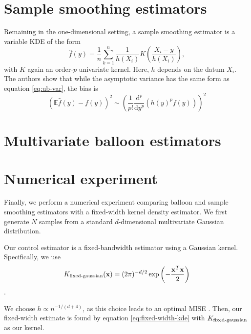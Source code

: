 \documentclass{article}
\newcommand{\E}{\mathbb{E}}
\begin{document}
\section{Sample smoothing estimators}
Remaining in the one-dimensional setting, a sample smoothing estimator is a variable KDE of the form 
\begin{equation}\label{eq:ss1}
    \hat{f}(y) = \frac{1}{n} \sum_{k=1}^n \frac{1}{h(X_i)}K\left(\frac{X_i-y}{h(X_i)}\right), 
\end{equation}
with $K$ again an order-$p$ univariate kernel. Here, $h$ depends on the datum $X_i$. The authors show that while the asymptotic variance has the same form as equation \eqref{eq:ub-var}, the bias is 
\begin{equation}
    \left(\E \hat{f}(y) - f(y)\right)^2 \sim \left( \frac{1}{p!} \frac{\text{d}^p}{\text{d}y^p} \left(h(y)^pf(y)\right) \right)^2
\end{equation}

\section{Multivariate balloon estimators}

\section{Numerical experiment}

Finally, we perform a numerical experiment comparing balloon and sample smoothing estimators with a fixed-width kernel density estimator. We first generate $N$ samples from a standard $d$-dimensional multivariate Gaussian distribution.

Our control estimator is a fixed-bandwidth estimator using a Gaussian kernel. Specifically, we use
\begin{equation}
    K_\textup{fixed-gaussian}(\mathbf{x}) = (2\pi)^{-d/2}\exp\left(-\frac{\mathbf{x}^T\mathbf{x}}{2}\right)
\end{equation}.

We choose $h \propto n^{-1/(d+4)}$, as this choice leads to an optimal MISE \cite{jnw}. Then, our fixed-width estimate is found by equation \eqref{eq:fixed-width-kde} with $K_\textup{fixed-gaussian}$ as our kernel.
\end{document}
